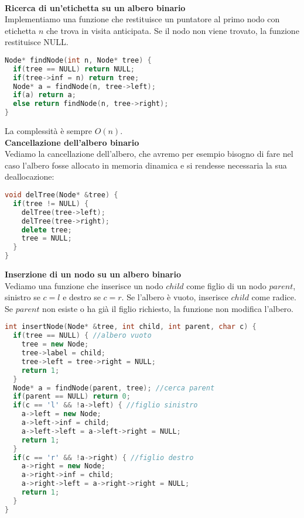 \documentclass[a4paper,12pt]{article}
\begin{document}
\\ \textbf{Ricerca di un'etichetta su un albero binario} \\
Implementiamo una funzione che restituisce un puntatore al primo nodo con etichetta $n$ che trova in visita
anticipata. Se il nodo non viene trovato, la funzione restituisce NULL.
\begin{lstlisting}[language=C++]
Node* findNode(int n, Node* tree) {
  if(tree == NULL) return NULL;
  if(tree->inf = n) return tree;
  Node* a = findNode(n, tree->left);
  if(a) return a;
  else return findNode(n, tree->right);
}
\end{lstlisting}
La complessità è sempre $O(n)$.
\\ \textbf{Cancellazione dell'albero binario} \\
Vediamo la cancellazione dell'albero, che avremo per esempio bisogno di fare nel caso l'albero fosse allocato
in memoria dinamica e si rendesse necessaria la sua deallocazione:
\begin{lstlisting}[language=C++]
void delTree(Node* &tree) {
  if(tree != NULL) {
    delTree(tree->left);
    delTree(tree->right);
    delete tree;
    tree = NULL;
  }
}
\end{lstlisting}
\textbf{Inserzione di un nodo su un albero binario} \\
Vediamo una funzione che inserisce un nodo $child$ come figlio di un nodo $parent$, sinistro se $c=l$ e destro se
$c=r$. Se l'albero è vuoto, inserisce $child$ come radice. Se $parent$ non esiste o ha già il figlio richiesto, la funzione
non modifica l'albero.
\begin{lstlisting}[language=C++]
int insertNode(Node* &tree, int child, int parent, char c) {
  if(tree == NULL) { //albero vuoto
    tree = new Node;
    tree->label = child;
    tree->left = tree->right = NULL;
    return 1;
  }
  Node* a = findNode(parent, tree); //cerca parent
  if(parent == NULL) return 0;
  if(c == 'l' && !a->left) { //figlio sinistro
    a->left = new Node;
    a->left->inf = child;
    a->left->left = a->left->right = NULL;
    return 1;
  }
  if(c == 'r' && !a->right) { //figlio destro
    a->right = new Node;
    a->right->inf = child;
    a->right->left = a->right->right = NULL;
    return 1;
  }
}
\end{lstlisting}
\end{document}
